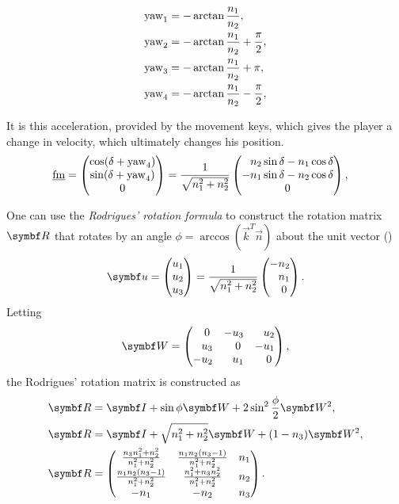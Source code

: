 \begin{align*}
\operatorname{yaw}_1 &= -\arctan\frac{n_1}{n_2},\\
\operatorname{yaw}_2 &= -\arctan\frac{n_1}{n_2} + \frac{\pi}{2},\\
\operatorname{yaw}_3 &= -\arctan\frac{n_1}{n_2} + \pi,\\
\operatorname{yaw}_4 &= -\arctan\frac{n_1}{n_2} - \frac{\pi}{2},
\end{align*}

It is this acceleration, provided by the movement keys, which gives the player a change in velocity, which ultimately changes his position.
\begin{align*}
\flat{\fmove} &=
\begin{pmatrix}
\cos(\delta+\yaw_4) \\ \sin(\delta+\yaw_4) \\ 0
\end{pmatrix} = \frac{1}{\sqrt{n_1^2 + n_2^2}}
\begin{pmatrix}
\hphantom{-}n_2\sin\delta - n_1\cos\delta\\
-n_1\sin\delta - n_2\cos\delta\\
0
\end{pmatrix},
\end{align*}

One can use the \emph{Rodrigues' rotation formula} to construct the rotation matrix $\mat{R}$ that rotates by an angle $\phi = \arccos(\vec{k}^T\vec{n})$ about the unit vector (\purplearrow)
\begin{equation}
\label{eq:u}
\vec{u} =
\begin{pmatrix}
u_1\\u_2\\u_3
\end{pmatrix} = \frac{1}{\sqrt{n_1^2 + n_2^2}}
\begin{pmatrix}
-n_2\\\hphantom{-}n_1\\\hphantom{-}0
\end{pmatrix}.
\end{equation}
Letting
\[
\mat{W} =
\begin{pmatrix}
\hphantom{-}0 & -u_3 & \hphantom{-}u_2\\
\hphantom{-}u_3 & \hphantom{-}0 & -u_1\\
-u_2 & \hphantom{-}u_1 & \hphantom{-}0
\end{pmatrix},
\]
the Rodrigues' rotation matrix is constructed as
\begin{align*}
\mat{R} &= \mat{I} + \sin \phi \mat{W} + 2\sin^2 \frac{\phi}{2}\mat{W}^2,\\
\mat{R} &= \mat{I} + \sqrt{n_1^2 + n_2^2}\mat{W} + (1 - n_3)\mat{W}^2,\\
\mat{R} &=
\begin{pmatrix}
\frac{n_3 n_1^2 + n_2^2}{n_1^2 + n_2^2} & \frac{n_1 n_2 (n_3 - 1)}{n_1^2 + n_2^2} & n_1\\
\frac{n_1 n_2 (n_3 - 1)}{n_1^2 + n_2^2} & \frac{n_1^2 + n_3 n_2^2}{n_1^2 + n_2^2} & n_2\\
-n_1 & -n_2 & n_3
\end{pmatrix}.
\end{align*}

